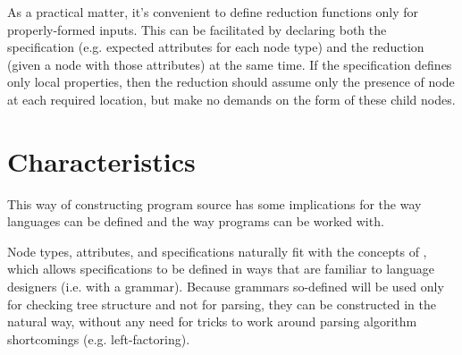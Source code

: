 As a practical matter, it's convenient to define reduction functions only for properly-formed inputs. This can be facilitated by declaring both the specification (e.g. expected attributes for each node type) and the reduction (given a node with those attributes) at the same time. If the specification defines only local properties, then the reduction should assume only the presence of  node at each required location, but make no demands on the form of these child nodes. 







\section{Characteristics}
This way of constructing program source has some implications for the way languages can be defined and the way programs can be worked with.

Node types, attributes, and specifications naturally fit with the concepts of , which allows specifications to be defined in ways that are familiar to language designers (i.e. with a grammar). Because grammars so-defined will be used only for checking tree structure and not for parsing, they can be constructed in the natural way, without any need for tricks to work around parsing algorithm shortcomings (e.g. left-factoring).


